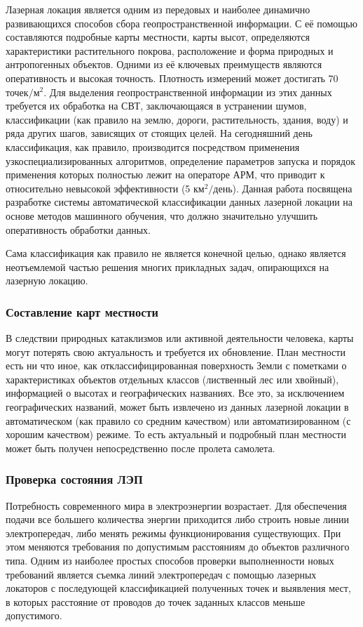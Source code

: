 Лазерная локация является одним из передовых и наиболее динамично развивающихся способов сбора геопространственной информации. С её помощью составляются подробные карты местности, карты высот, определяются характеристики растительного покрова, расположение и форма природных и антропогенных объектов. Одними из её ключевых преимуществ являются оперативность и высокая точность. Плотность измерений может достигать 70 $\mbox{точек}/\mbox{м}^2$. Для выделения геопространственной информации из этих данных требуется их обработка на СВТ, заключающаяся в устранении шумов, классификации (как правило на землю, дороги, растительность, здания, воду) и ряда других шагов, зависящих от стоящих целей. На сегодняшний день классификация, как правило, производится посредством применения узкоспециализированных алгоритмов, определение параметров запуска и порядок применения которых полностью лежит на операторе АРМ, что приводит к относительно невысокой эффективности (5 $\mbox{км}^2/\mbox{день}$). Данная работа посвящена разработке системы автоматической классификации данных лазерной локации на основе методов машинного обучения, что должно значительно улучшить оперативность обработки данных.

Сама классификация как правило не является конечной целью, однако является неотъемлемой частью решения многих прикладных задач, опирающихся на лазерную локацию.

\subsubsection{Составление карт местности}
В следствии природных катаклизмов или активной деятельности человека, карты могут потерять свою актуальность и требуется их обновление. План местности есть ни что иное, как отклассифицированная поверхность Земли с пометками о характеристиках объектов отдельных классов (лиственный лес или хвойный), информацией о высотах и географических названиях. Все это, за исключением географических названий, может быть извлечено из данных лазерной локации в автоматическом (как правило со средним качеством) или автоматизированном (с хорошим качеством) режиме. То есть актуальный и подробный план местности может быть получен непосредственно после пролета самолета.

\subsubsection{Проверка состояния ЛЭП}
Потребность современного мира в электроэнергии возрастает. Для обеспечения подачи все большего количества энергии приходится либо строить новые линии электропередач, либо менять режимы функционирования существующих. При этом меняются требования по допустимым расстояниям до объектов различного типа. Одним из наиболее простых способов проверки выполненности новых требований  является съемка линий электропередач с помощью лазерных локаторов с последующей классификацией полученных точек и выявления мест, в которых расстояние от проводов до точек заданных классов меньше допустимого. 

